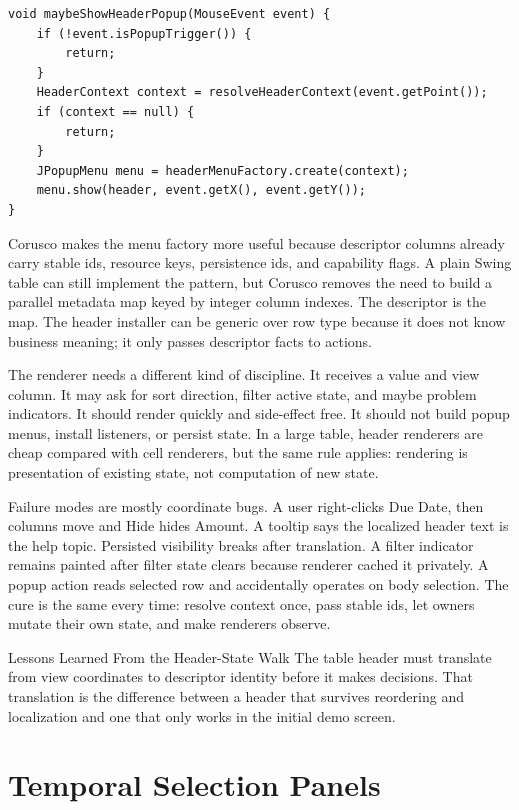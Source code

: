 \begin{lstlisting}[caption={A header installer converts events before action creation.}]
void maybeShowHeaderPopup(MouseEvent event) {
    if (!event.isPopupTrigger()) {
        return;
    }
    HeaderContext context = resolveHeaderContext(event.getPoint());
    if (context == null) {
        return;
    }
    JPopupMenu menu = headerMenuFactory.create(context);
    menu.show(header, event.getX(), event.getY());
}
\end{lstlisting}

Corusco makes the menu factory more useful because descriptor columns already carry
stable ids, resource keys, persistence ids, and capability flags. A plain Swing table
can still implement the pattern, but Corusco removes the need to build a parallel
metadata map keyed by integer column indexes. The descriptor is the map. The header
installer can be generic over row type because it does not know business meaning; it
only passes descriptor facts to actions.

The renderer needs a different kind of discipline. It receives a value and view column.
It may ask for sort direction, filter active state, and maybe problem indicators. It
should render quickly and side-effect free. It should not build popup menus, install
listeners, or persist state. In a large table, header renderers are cheap compared with
cell renderers, but the same rule applies: rendering is presentation of existing state,
not computation of new state.

Failure modes are mostly coordinate bugs. A user right-clicks Due Date, then columns
move and Hide hides Amount. A tooltip says the localized header text is the help topic.
Persisted visibility breaks after translation. A filter indicator remains painted after
filter state clears because renderer cached it privately. A popup action reads selected
row and accidentally operates on body selection. The cure is the same every time:
resolve context once, pass stable ids, let owners mutate their own state, and make
renderers observe.

\begin{principlebox}{Lessons Learned From the Header-State Walk}
The table header must translate from view coordinates to descriptor identity
before it makes decisions. That translation is the difference between a header
that survives reordering and localization and one that only works in the initial
demo screen.
\end{principlebox}

\section{Temporal Selection Panels}

